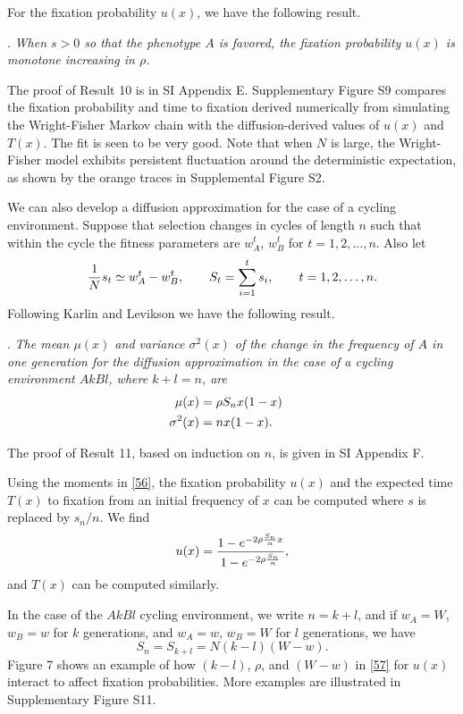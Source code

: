 \documentclass[9pt,twocolumn,twoside,lineno]{pnas-new}
\newcommand{\an}[1]{\begin{align}#1\end{align}}
\begin{document}
  For the fixation probability $u(x)$,  we have the following result.
 \medskip
  
. {\sl When $s>0$ so that the phenotype $A$ is favored, the fixation probability $u(x)$ is monotone increasing in $\rho$.}\par
 \medskip
 
 The proof of Result 10 is in SI Appendix E.  
  Supplementary Figure S9 compares the fixation probability and time to fixation derived numerically from  simulating the Wright-Fisher Markov chain with the diffusion-derived values of $u(x)$ and $T(x)$. The fit is seen to be very good. Note that when $N$ is large, the Wright-Fisher model exhibits persistent fluctuation around the deterministic expectation, as shown by the orange traces in Supplemental Figure S2.
 
 We can also develop a diffusion approximation for the case of a cycling environment. Suppose that selection changes in cycles of length $n$ such that within the cycle the fitness parameters are $w_A^t$, $w_B^t$ for $t=1,2,\dots,n$. Also let
 \begin{equation}
 {1\over N}s_t \simeq w_A^t -w_B^t,\qquad S_t =\sum_{i=1}^t s_i,\qquad t=1,2,\dots,n.
 \label{55}\end{equation}
 Following Karlin and Levikson \cite{karlin1974temporal} we have the following result.
 \medskip
 
 . {\sl The mean $\mu(x)$ and variance $\sigma^2(x)$ of the change in the frequency of $A$ in one generation for the diffusion approximation in the case of a cycling environment $AkBl$, where $k+l=n$, are
 \begin{equation}
 \an{
 \mu(x) &= \rho S_n x(1-x)\cr \sigma^2(x) &= nx(1-x).}
 \label{56}\end{equation}}
 
\noindent The proof of Result 11, based on induction on $n$, is given in SI Appendix F.
 
  
 Using the moments in \eqref{56}, the fixation probability $u(x)$ and the expected time $T(x)$ to fixation from an initial frequency of $x$ can be computed where $s$ is replaced by $s_n/n$. We find
 \begin{equation}
 u(x) ={1-e^{-2\rho{S_n\over n}x}\over 1-e^{-2\rho{S_n\over n}}},
\label{57} \end{equation}
 and $T(x)$ can be computed similarly.
 
 In the  case of the $AkBl$ cycling environment, we write $n=k+l$, and if $w_A=W$, $w_B=w$ for $k$ generations, and $w_A=w$, $w_B=W$ for $l$ generations, we have
 \begin{equation}
 S_n=S_{k+l} =N(k-l)(W-w).
 \label{58}\end{equation}
 Figure 7 shows an example of how $(k-l)$, $\rho$, and $(W-w)$  in \eqref{57} for $u(x)$ interact to affect fixation probabilities. More examples are illustrated in Supplementary Figure S11.
\end{document}
